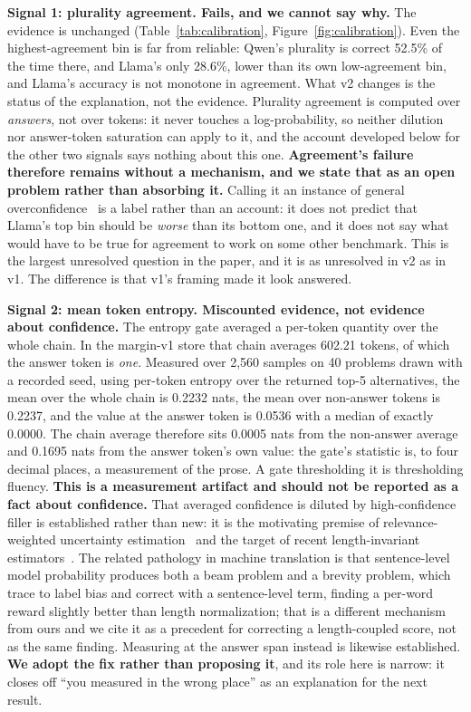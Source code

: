 \documentclass{article}
\begin{document}
\textbf{Signal 1: plurality agreement. Fails, and we cannot say why.} The
evidence is unchanged (Table~\ref{tab:calibration},
Figure~\ref{fig:calibration}). Even the highest-agreement bin is far from
reliable: Qwen's plurality is correct 52.5\% of the time there, and Llama's
only 28.6\%, lower than its own low-agreement bin, and Llama's accuracy is not
monotone in agreement. What v2 changes is the status of the explanation, not
the evidence. Plurality agreement is computed over \emph{answers}, not over
tokens: it never touches a log-probability, so neither dilution nor
answer-token saturation can apply to it, and the account developed below for
the other two signals says nothing about this one. \textbf{Agreement's failure
therefore remains without a mechanism, and we state that as an open problem
rather than absorbing it.} Calling it an instance of general
overconfidence~\citep{guo2017calibration, kadavath2022language} is a label
rather than an account: it does not predict that Llama's top bin should be
\emph{worse} than its bottom one, and it does not say what would have to be
true for agreement to work on some other benchmark. This is the largest
unresolved question in the paper, and it is as unresolved in v2 as in v1. The
difference is that v1's framing made it look answered.

\textbf{Signal 2: mean token entropy. Miscounted evidence, not evidence about
confidence.} The entropy gate averaged a per-token quantity over the whole
chain. In the margin-v1 store that chain averages 602.21 tokens, of which the
answer token is \emph{one}. Measured over 2,560 samples on 40 problems drawn
with a recorded seed, using per-token entropy over the returned top-5
alternatives, the mean over the whole chain is 0.2232 nats, the mean over
non-answer tokens is 0.2237, and the value at the answer token is 0.0536 with a
median of exactly 0.0000. The chain average therefore sits 0.0005 nats from the
non-answer average and 0.1695 nats from the answer token's own value: the
gate's statistic is, to four decimal places, a measurement of the prose. A gate
thresholding it is thresholding fluency. \textbf{This is a measurement artifact
and should not be reported as a fact about confidence.} That averaged
confidence is diluted by high-confidence filler is established rather than new:
it is the motivating premise of relevance-weighted uncertainty
estimation~\citep{duan2024shifting} and the target of recent length-invariant
estimators~\citep{fadeeva2025uncertaintyline}. The related pathology in machine
translation is that sentence-level model probability produces both a beam
problem and a brevity problem, which~\citet{murray2018correcting} trace to
label bias and correct with a sentence-level term, finding a per-word reward
slightly better than length normalization; that is a different mechanism from
ours and we cite it as a precedent for correcting a length-coupled score, not
as the same finding. Measuring at the answer span instead is likewise
established. \textbf{We adopt the fix rather than proposing it}, and its role
here is narrow: it closes off ``you measured in the wrong place'' as an
explanation for the next result.
\end{document}
